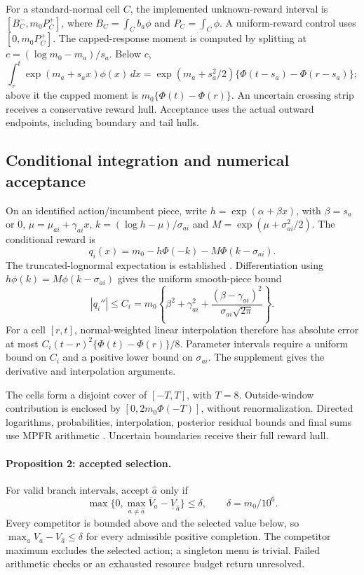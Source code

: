 For a standard-normal cell $C$, the implemented unknown-reward interval is $[B_C^-,m_0P_C^+]$, where $B_C=\int_C b_a\phi$ and $P_C=\int_C\phi$. A uniform-reward control uses $[0,m_0P_C^+]$. The capped-response moment is computed by splitting at $c=(\log m_0-m_a)/s_a$. Below $c$,
\begin{equation}
\int_r^t\exp(m_a+s_ax)\phi(x)\,dx
=\exp(m_a+s_a^2/2)\{\Phi(t-s_a)-\Phi(r-s_a)\};
\label{eq:final_moment}
\end{equation}
above it the capped moment is $m_0\{\Phi(t)-\Phi(r)\}$. An uncertain crossing strip receives a conservative reward hull. Acceptance uses the actual outward endpoints, including boundary and tail hulls.

\subsection{Conditional integration and numerical acceptance}

On an identified action/incumbent piece, write $h=\exp(\alpha+\beta x)$, with $\beta=s_a$ or $0$, $\mu=\mu_{ai}+\gamma_{ai}x$, $k=(\log h-\mu)/\sigma_{ai}$ and $M=\exp(\mu+\sigma_{ai}^2/2)$. The conditional reward is
\begin{equation}
q_i(x)=m_0-h\Phi(-k)-M\Phi(k-\sigma_{ai}).
\label{eq:final_q}
\end{equation}
The truncated-lognormal expectation is established \citep{ref45}. Differentiation using $h\phi(k)=M\phi(k-\sigma_{ai})$ gives the uniform smooth-piece bound
\begin{equation}
|q_i''|\le C_i=m_0\left\{\beta^2+\gamma_{ai}^2+
\frac{(\beta-\gamma_{ai})^2}{\sigma_{ai}\sqrt{2\pi}}\right\}.
\label{eq:final_curvature}
\end{equation}
For a cell $[r,t]$, normal-weighted linear interpolation therefore has absolute error at most $C_i(t-r)^2\{\Phi(t)-\Phi(r)\}/8$. Parameter intervals require a uniform bound on $C_i$ and a positive lower bound on $\sigma_{ai}$. The supplement gives the derivative and interpolation arguments.

The cells form a disjoint cover of $[-T,T]$, with $T=8$. Outside-window contribution is enclosed by $[0,2m_0\Phi(-T)]$, without renormalization. Directed logarithms, probabilities, interpolation, posterior residual bounds and final sums use MPFR arithmetic \citep{ref46}. Uncertain boundaries receive their full reward hull.

\paragraph{Proposition 2: accepted selection.}
For valid branch intervals, accept $\hat a$ only if
\begin{equation}
\max\{0,\max_{a\ne\hat a}\overline V_a-\underline V_{\hat a}\}
\le\delta,\qquad\delta=m_0/10^6.
\label{eq:final_acceptance}
\end{equation}
Every competitor is bounded above and the selected value below, so $\max_aV_a-V_{\hat a}\le\delta$ for every admissible positive completion. The competitor maximum excludes the selected action; a singleton menu is trivial. Failed arithmetic checks or an exhausted resource budget return unresolved.

